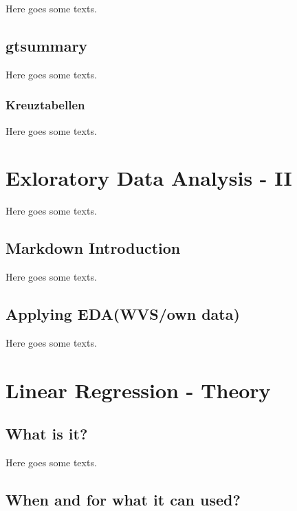 \documentclass[
]{book}
\begin{document}
Here goes some texts.

\hypertarget{gtsummary}{%
\section{gtsummary}\label{gtsummary}}

Here goes some texts.

\hypertarget{kreuztabellen}{%
\subsection{Kreuztabellen}\label{kreuztabellen}}

Here goes some texts.

\hypertarget{eda-2}{%
\chapter{Exloratory Data Analysis - II}\label{eda-2}}

Here goes some texts.

\hypertarget{markdown-introduction}{%
\section{Markdown Introduction}\label{markdown-introduction}}

Here goes some texts.

\hypertarget{applying-edawvsown-data}{%
\section{Applying EDA(WVS/own data)}\label{applying-edawvsown-data}}

Here goes some texts.

\hypertarget{lin-t}{%
\chapter{Linear Regression - Theory}\label{lin-t}}

\hypertarget{what-is-it}{%
\section{What is it?}\label{what-is-it}}

Here goes some texts.

\hypertarget{when-and-for-what-it-can-used}{%
\section{When and for what it can used?}\label{when-and-for-what-it-can-used}}
\end{document}
